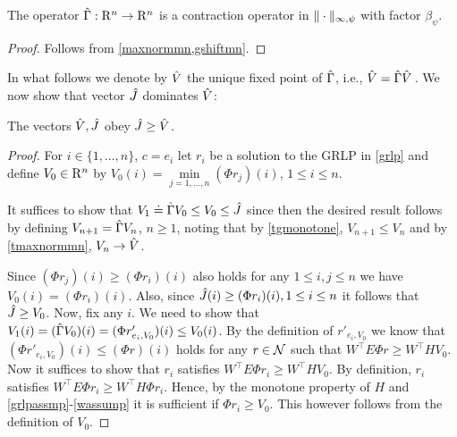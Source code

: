 \begin{comment}
\begin{theorem}\label{gmaxcontramn}
The operator $\Gamma  \colon \R^n\ra \R^n$ is a contraction operator in $\norm{\cdot}_{\mn}$ with factor $\beta_{\psi}$.
\end{theorem}
\end{comment}
\begin{theorem}\label{hgmaxcontramn}
The operator $\hat{\Gamma}:\mathrm{R}^n\to\mathrm{R}^n$  is a contraction operator in $\|\cdot\|_{\infty,\psi}$ with factor $\beta_{\psi}$.
\end{theorem}
\begin{proof}
Follows from \cref{maxnormmn,gshiftmn}.
\begin{comment}
We already know that $\hg$ is monotone. That $\hg$ satisfies~\cref{eq:shiftmn}
with $\beta = \beta_{\psi}$ follows similarly to the argument used in  \cref{tgshift}
with modifications similar to those introduced in the proof of \cref{gshiftmn}.
Then, \cref{gmaxcontramn} gives the desired result.
\end{comment}
\end{proof}
In what follows we denote by $\hat{V}$ the unique fixed point of $\hat{\Gamma}$, i.e., $\hat{V} = \hat{\Gamma} \hat{V}\,$. 
We now show that vector $\hat{J}$ dominates $\hat{V}$:
\begin{lemma}\label{relation1}
The vectors $\hat{V},\hat{J}$ obey $\hat{J}\geq\hat{V}$.
\end{lemma}
\begin{proof}
For $i\in \{1,\dots,n\}$, $c=e_i$ let $r_i$ be a solution to the GRLP in \eqref{grlp}
and define $V_0\in \mathrm{R}^n$ by $V_0(i)=\underset{j=1,\ldots,n}{\min}(\Phi r_j)(i)$, $1\le i \le n$.

It suffices to show that $V_1\doteq \hat{\Gamma} V_0 \le V_0 \le \hat{J}$ since then the desired result follows
by defining $V_{n+1} = \hat{\Gamma} V_n$, $n\ge 1$, noting that by \cref{tgmonotone}, $V_{n+1}\le V_{n}$ and by  \cref{tmaxnormmn}, $V_n \to \hat{V}$.

Since $(\Phi r_j)(i) \ge (\Phi r_i)(i)$ also holds for any $1\leq i,j\leq n$ we have $V_0(i)  = (\Phi r_i)(i)$. Also, since $\hat{J}(i) \ge (\Phi r_i)(i),1\leq i \leq n$ it follows that $\hat{J}\geq V_0$. 
Now,  fix any $i$. 
We need to show that $V_1(i)=(\hat{\Gamma} V_0)(i) = (\Phi r'_{e_i,V_0})(i) \leq V_0(i)$. 
By the definition of $r'_{e_i,V_0}$ we know that $(\Phi r'_{e_i,V_0})(i) \le (\Phi r)(i)$
holds for any $r\in \mathcal{N}$ such that $W^\top E \Phi r \ge W^\top H V_0$. 
Now it suffices to show that $r_i$ satisfies $W^\top E \Phi r_i \ge W^\top H V_0$. 
By definition, $r_i$ satisfies $W^\top E \Phi r_i \ge W^\top H \Phi r_i$.
Hence, by the monotone property of $H$ and \cref{grlpassmp}-\eqref{wassump} it is sufficient if $\Phi r_i \ge V_0$.
This however follows from the definition of $V_0$.
\end{proof}
